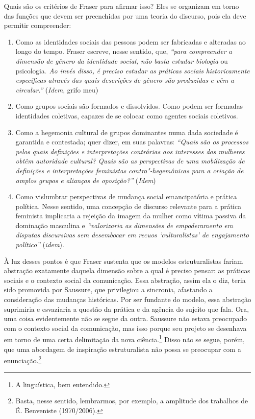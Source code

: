 Quais são os critérios de Fraser para afirmar isso? Eles se organizam em
torno das funções que devem ser preenchidas por uma teoria do discurso,
pois ela deve permitir compreender:

\begin{enumerate}
\def\labelenumi{\arabic{enumi})}
\item
Como as identidades sociais das pessoas podem ser fabricadas e
alteradas ao longo do tempo. Fraser escreve, nesse sentido, que,
\emph{``para compreender a dimensão de gênero da identidade social, não
basta estudar biologia} ou psicologia\emph{. Ao invés disso, é preciso
estudar as práticas sociais historicamente específicas através das quais
descrições de gênero são produzidas e vêm a circular.''} (\emph{Idem},
grifo meu)
\item
Como grupos sociais são formados e dissolvidos. Como podem ser
formadas identidades coletivas, capazes de se colocar como agentes
sociais coletivos.
\item
Como a hegemonia cultural de grupos dominantes numa dada sociedade é
garantida e contestada; quer dizer, em suas palavras: \emph{``Quais são
os processos pelos quais definições e interpretações contrárias aos
interesses das mulheres obtêm autoridade cultural? Quais são as
perspectivas de uma mobilização de definições e interpretações
feministas contra"-hegemônicas para a criação de amplos grupos e alianças
de oposição?''} (\emph{Idem})
\item
Como vislumbrar perspectivas de mudança social emancipatória e
prática política. Nesse sentido, uma concepção de discurso relevante
para a prática feminista implicaria a rejeição da imagem da mulher como
vítima passiva da dominação masculina e \emph{``valorizaria as dimensões
de empoderamento em disputas discursivas sem desembocar em recuos
`culturalistas' de engajamento político''} (\emph{idem}).
\end{enumerate}

À luz desses pontos é que Fraser sustenta que os modelos estruturalistas
fariam abstração exatamente daquela dimensão sobre a qual é preciso
pensar: as práticas sociais e o contexto social da comunicação. Essa
abstração, assim ela o diz, teria sido promovida por Saussure, que
privilegiou a sincronia, afastando a consideração das mudanças
históricas. Por ser fundante do modelo, essa abstração suprimiria e
esvaziaria a questão da prática e da agência do sujeito que fala. Ora,
uma coisa evidentemente não se segue da outra. Saussure não estava
preocupado com o contexto social da comunicação, mas isso porque seu
projeto se desenhava em torno de uma certa delimitação da nova
ciência.\footnote{A linguística, bem entendido.} Disso não se segue,
porém, que uma abordagem de inspiração estruturalista não possa se
preocupar com a enunciação.\footnote{Basta, nesse sentido, lembrarmos,
  por exemplo, a amplitude dos trabalhos de É. Benveniste (1970/2006).}

